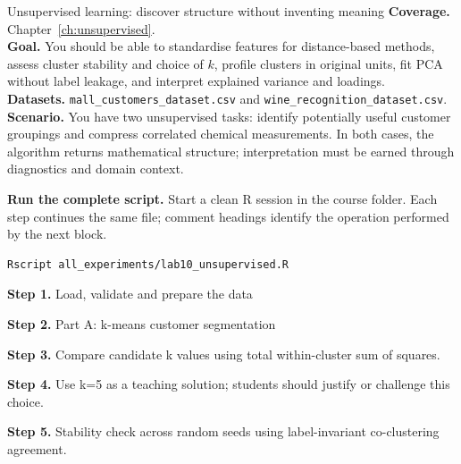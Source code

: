 
\begin{labproject}{Unsupervised learning: discover structure without inventing meaning}
\textbf{Coverage.} Chapter~\ref{ch:unsupervised}.\\
\textbf{Goal.} You should be able to standardise features for distance-based methods, assess cluster stability and choice of $k$, profile clusters in original units, fit PCA without label leakage, and interpret explained variance and loadings.\\
\textbf{Datasets.} \texttt{mall\_customers\_dataset.csv} and \texttt{wine\_recognition\_dataset.csv}.\\
\textbf{Scenario.} You have two unsupervised tasks: identify potentially useful customer groupings and compress correlated chemical measurements. In both cases, the algorithm returns mathematical structure; interpretation must be earned through diagnostics and domain context.



\textbf{Run the complete script.} Start a clean R session in the course folder. Each step continues the same file; comment headings identify the operation performed by the next block.
\begin{lstlisting}[style=utpterminal]
Rscript all_experiments/lab10_unsupervised.R
\end{lstlisting}

\noindent\textbf{Step 1.} Load, validate and prepare the data


\noindent\textbf{Step 2.} Part A: k-means customer segmentation



\noindent\textbf{Step 3.} Compare candidate k values using total within-cluster sum of squares.


\noindent\textbf{Step 4.} Use k=5 as a teaching solution; students should justify or challenge this choice.


\noindent\textbf{Step 5.} Stability check across random seeds using label-invariant co-clustering agreement.



\end{labproject}
